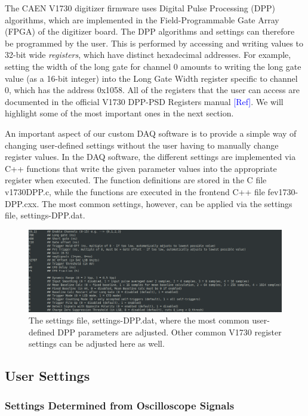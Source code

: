 The CAEN V1730 digitizer firmware uses Digital Pulse Processing (DPP) algorithms, which are implemented in the Field-Programmable Gate Array (FPGA) of the digitizer board. The DPP algorithms and settings can therefore be programmed by the user. This is performed by accessing and writing values to 32-bit wide \textit{registers}, which have distinct hexadecimal addresses. For example, setting the width of the long gate for channel 0 amounts to writing the long gate value (as a 16-bit integer) into the Long Gate Width register specific to channel 0, which has the address 0x1058. All of the registers that the user can access are documented in the official V1730 DPP-PSD Registers manual \textcolor{blue}{[Ref]}. %
We will highlight some of the most important ones in the next section.

An important aspect of our custom DAQ software is to provide a simple way of changing user-defined settings without the user having to manually change register values. In the DAQ software, the different settings are implemented via C++ functions that write the given parameter values into the appropriate register when executed. The function definitions are stored in the C file v1730DPP.c, while the functions are executed in the frontend C++ file fev1730-DPP.cxx. The most common settings, however, can be applied via the settings file, settings-DPP.dat.

\begin{figure}[b!]
\centering
\includegraphics[scale=0.33]{Chapter-5/figs/settings_file.png}
\caption{The settings file, settings-DPP.dat, where the most common user-defined DPP parameters are adjusted. Other common V1730 register settings can be adjusted here as well.}
\label{settings_file}
\end{figure}

\subsection{User Settings} \label{settings}

\subsubsection{Settings Determined from Oscilloscope Signals} \label{oscilloscope}

